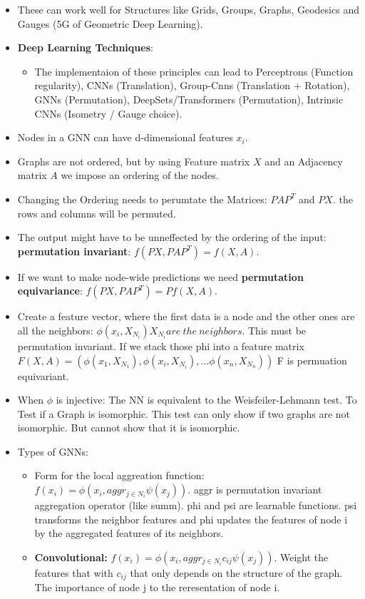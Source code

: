 \begin{itemize}[noitemsep,nolistsep]
	\item These can work well for Structures like Grids, Groups, Graphs, Geodesics and Gauges (5G of Geometric Deep Learning).
	\item \textbf{Deep Learning Techniques}:
	\begin{itemize}[noitemsep,nolistsep]
		\item The implementaion of these principles can lead to Perceptrons (Function regularity), CNNs (Translation), Group-Cnns (Translation + Rotation), GNNs (Permutation), DeepSets/Transformers (Permutation), Intrinsic CNNs (Isometry / Gauge choice).
	\end{itemize}
	\item Nodes in a GNN can have d-dimensional features $x_i$.
	\item Graphs are not ordered, but by using Feature matrix $X$ and an Adjacency matrix $A$ we impose an ordering of the nodes. 
	\item Changing the Ordering needs to perumtate the Matrices: $PAP^T$ and $PX$. the rows and columns will be permuted.
	\item The output might have to be unneffected by the ordering of the input: \textbf{permutation invariant}: $f(PX, PAP^T) = f(X,A)$.
	\item If we want to make node-wide predictions we need \textbf{permutation equivariance}:  $f(PX, PAP^T) = Pf(X,A)$.
	\item Create a feature vector, where the first data is a node and the other ones are all the neighbors: $\phi(x_i, X_{N_i}) X_{N_i} are\ the\ neighbors$. This must be permutation invariant. If we stack those phi into a feature matrix $F(X,A) = (\phi(x_1, X_{N_1}), \phi(x_i, X_{N_i}), \dots \phi(x_n, X_{N_n}))$ F is permuation equivariant.
	\item When $\phi$ is injective: The NN is equivalent to the Weisfeiler-Lehmann test. To Test if a Graph is isomorphic. This test can only show if two graphs are not isomorphic. But cannot show that it is isomorphic.
	\item Types of GNNs:
	\begin{itemize}[noitemsep,nolistsep]
		\item Form for the local aggreation function: $f(x_i) = \phi(x_i, aggr_{j \in N_i} \psi(x_j)).$ aggr is permutation invariant aggregation operator (like summ). phi and psi are learnable functions. psi transforms the neighbor features and phi updates the features of node i by the aggregated features of its neighbors.
		\item \textbf{Convolutional:} $f(x_i) = \phi(x_i, aggr_{j \in N_i} c_{ij} \psi(x_j)).$ Weight the features that with $c_{ij}$ that only depends on the structure of the graph. The importance of node j to the reresentation of node i.

\end{itemize}
\end{itemize}
